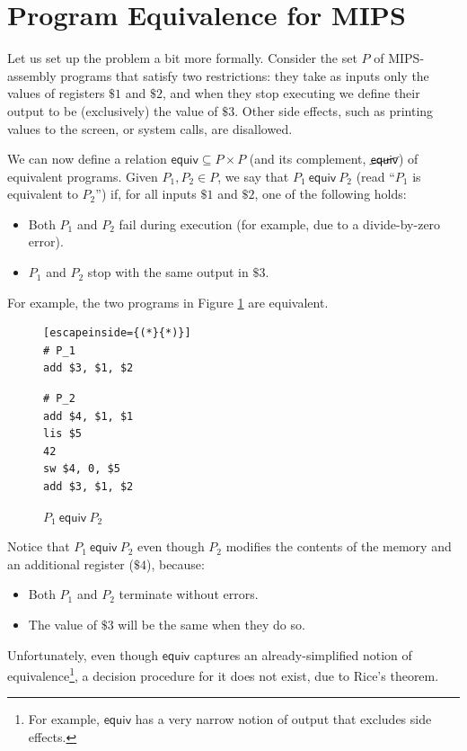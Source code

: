 \documentclass{llncs}
\newcommand{\erel}{\textsf{equiv}}
\newcommand{\pequiv}[2]{#1 \ \erel \ #2}
\begin{document}
\section{Program Equivalence for MIPS}

Let us set up the problem a bit more formally. Consider the set $P$ of MIPS-assembly programs that satisfy two restrictions: they take as inputs only the values of registers $\$1$ and $\$2$, and when they stop executing we define their output to be (exclusively) the value of $\$3$. Other side effects, such as printing values to the screen, or system calls, are disallowed.

We can now define a relation $\erel \subseteq P \times P$ (and its complement, $\cancel{\erel}$) of equivalent programs. Given $P_1, P_2 \in P$, we say that $\pequiv{P_1}{P_2}$ (read ``$P_1$ is equivalent to $P_2$'') if, for all inputs $\$1$ and $\$2$, one of the following holds:
\begin{itemize}
\item Both $P_1$ and $P_2$ fail during execution (for example, due to a divide-by-zero error).
\item $P_1$ and $P_2$ stop with the same output in $\$3$. 
\end{itemize} 

For example, the two programs in Figure \ref{equivprogs} are equivalent.
 
\begin{figure}
\begin{multicols}{2}
\begin{lstlisting}[escapeinside={(*}{*)}]
# P_1
add $3, $1, $2
\end{lstlisting}
\vfill\null
\columnbreak
\begin{lstlisting}
# P_2
add $4, $1, $1
lis $5
42
sw $4, 0, $5
add $3, $1, $2
\end{lstlisting}
\end{multicols}
\caption{$\pequiv{P_1}{P_2}$}
\label{equivprogs}
\end{figure}

Notice that $\pequiv{P_1}{P_2}$ even though $P_2$ modifies the contents of the memory and an additional register ($\$4$), because:
\begin{itemize}
\item Both $P_1$ and $P_2$ terminate without errors.
\item The value of $\$3$ will be the same when they do so.
\end{itemize}

Unfortunately, even though $\erel$ captures an already-simplified notion of equivalence\footnote{For example, $\erel$ has a very narrow notion of output that excludes side effects.}, a decision procedure for it does not exist, due to Rice's theorem.
\end{document}
